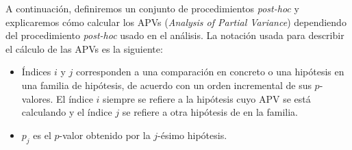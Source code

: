 A continuación, definiremos un conjunto de procedimientos \textit{post-hoc} y explicaremos cómo calcular los APVs (\textit{Analysis of Partial Variance}) dependiendo del procedimiento \textit{post-hoc} usado en el análisis. 
La notación usada para describir el cálculo de las APVs es la siguiente:
\begin{itemize}
	\item Índices $i$ y $j$ corresponden a una comparación en concreto o una hipótesis en una familia de hipótesis, de acuerdo con un orden incremental de sus $p$-valores. 
El índice $i$ siempre se refiere a la hipótesis cuyo APV se está calculando y el índice $j$ se refiere a otra hipótesis de en la familia. 
	\item $p_j$ es el $p$-valor obtenido por la $j$-ésimo hipótesis. 
\end{itemize}

